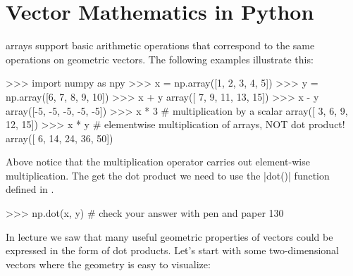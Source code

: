 
\section{Vector Mathematics in Python}

\numpy arrays support basic arithmetic operations that
correspond to the same operations on geometric vectors. The following examples illustrate this:
%
\begin{python}
>>> import numpy as npy
>>> x = np.array([1, 2, 3, 4, 5])
>>> y = np.array([6, 7, 8, 9, 10])
>>> x + y
array([ 7,  9, 11, 13, 15])
>>> x - y
array([-5, -5, -5, -5, -5])
>>> x * 3    # multiplication by a scalar
array([ 3,  6,  9, 12, 15])
>>> x * y    # elementwise multiplication of arrays, NOT dot product! 
array([ 6, 14, 24, 36, 50])
\end{python}
%
Above notice that the multiplication operator carries out element-wise multiplication.  The get the dot product we need to use the |dot()| function defined in \numpy.
%
\begin{python}
>>> np.dot(x, y)   # check your answer with pen and paper
130
\end{python}

In lecture we saw that many useful geometric properties of vectors could be expressed in the form of dot products. Let's start with some two-dimensional vectors where the geometry is  easy to visualize:

